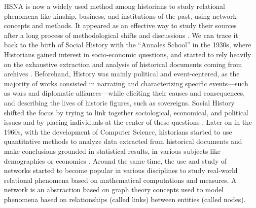 HSNA is now a widely used method among historians to study relational phenomena like kinship, business, and institutions of the past, using network concepts and methods.
It appeared as an effective way to study their sources after a long process of methodological shifts and discussions \cite{cristofoliAuxSourcesGrands2008}.
We can trace it back to the birth of Social History with the ``Annales School'' in the 1930s, where Historians gained interest in socio-economic questions, and started to rely heavily on the exhaustive extraction and analysis of historical documents coming from archives \cite{blochApologiePourHistoire1949}.
Beforehand, History was mainly political and event-centered, as the majority of works consisted in narrating and characterizing specific events---such as wars and diplomatic alliances---while eliciting their causes and consequences, and describing the lives of historic figures, such as sovereigns.
Social History shifted the focus by trying to link together sociological, economical, and political issues and by placing individuals at the center of these questions \cite{prost2014}.
Later on in the 1960s, with the development of Computer Science, historians started to use quantitative methods to analyze data extracted from historical documents and make conclusions grounded in statistical results, in various subjects like demographics \cite{henryRegistresParoissiauxHistoire1956} or economics \cite{goldinCliometricsNobel1995}.
Around the same time, the use and study of networks started to become popular in various disciplines to study real-world relational phenomena based on mathematical computations and measures.
A network is an abstraction based on graph theory concepts used to model phenomena based on relationships (called links) between entities (called nodes).

